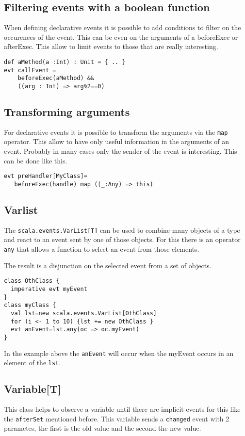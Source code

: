 \documentclass{article}
\begin{document}
\subsection{Filtering events with a boolean function}

When defining declarative events it is possible to add conditions
to filter on the occurences of the event. This can be even on the 
arguments of a beforeExec or afterExec. This allow to limit events 
to those that are really interesting.

\begin{lstlisting}
def aMethod(a :Int) : Unit = { .. }
evt callEvent = 
    beforeExec(aMethod) && 
    ((arg : Int) => arg%2==0)
\end{lstlisting}

\subsection{Transforming arguments}
For declarative events it is possible to transform the arguments
via the {\tt map} operator. This allow to have only useful information
in the arguments of an event. Probably in many cases only the sender of
the event is interesting. This can be done like this.

\begin{lstlisting}
evt preHandler[MyClass]=
   beforeExec(handle) map ((_:Any) => this)
\end{lstlisting}

\subsection{Varlist}
The {\tt scala.events.VarList[T]} can be used to combine many objects
of a type and react to an event sent by one of those objects. For this 
there is an operator {\tt any} that allows a function to select an 
event from those elements.

The result is a disjunction on the selected event from a set of objects.

\begin{lstlisting}
class OthClass {
  imperative evt myEvent 
}
class myClass {
  val lst=new scala.events.VarList[OthClass]
  for (i <- 1 to 10) {lst += new OthClass }
  evt anEvent=lst.any(oc => oc.myEvent)
}
\end{lstlisting}

In the example above the {\tt anEvent} will occur when the myEvent
 occurs in an element of the {\tt lst}.


\subsection{Variable[T]}
This class helps to observe a variable until there are implicit events
for this like the {\tt afterSet} mentioned before. This variable sends 
a {\tt changed} event with 2 parametes, the first is the old value
and the second the new value.
\end{document}
